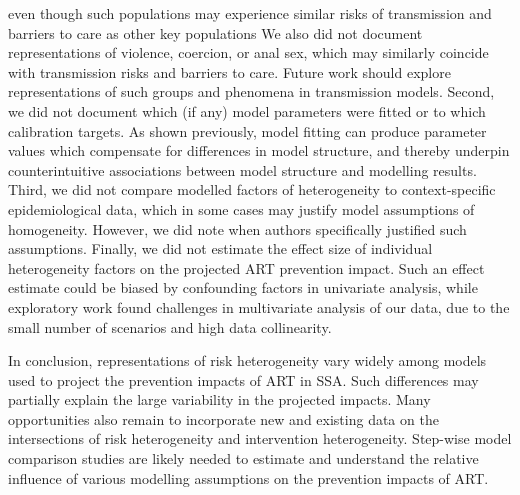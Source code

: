 even though such populations may experience similar risks of transmission and barriers to care
as other key populations\cite{Tanser2015,Dellar2015}
We also did not document representations of violence, coercion, or anal sex,
which may similarly coincide with transmission risks and barriers to care.
\cite{Silverman2011,Baggaley2013}
Future work should explore representations of
such groups and phenomena in transmission models.
Second, we did not document which (if any) model parameters were fitted
or to which calibration targets.
As shown previously\cite{Eaton2014a,Knight2020}, model fitting can produce
parameter values which compensate for differences in model structure,
and thereby underpin counterintuitive associations between model structure and modelling results.
Third, we did not compare modelled factors of heterogeneity to
context-specific epidemiological data,
which in some cases may justify model assumptions of homogeneity.
However, we did note when authors specifically justified such assumptions.
Finally, we did not estimate the effect size of
individual heterogeneity factors on the projected ART prevention impact.
Such an effect estimate could be biased by confounding factors in univariate analysis,
while exploratory work found challenges in multivariate analysis of our data,
due to the small number of scenarios and high data collinearity.
\par
In conclusion, representations of risk heterogeneity vary widely
among models used to project the prevention impacts of ART in SSA.
Such differences may partially explain the large variability in the projected impacts.
Many opportunities also remain to incorporate new and existing data on
the intersections of risk heterogeneity and intervention heterogeneity.
Step-wise model comparison studies are likely needed to
estimate and understand the relative influence
of various modelling assumptions on the prevention impacts of ART.
